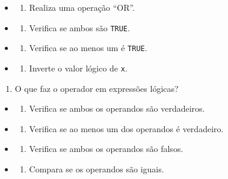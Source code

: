 \documentclass[
]{book}
\providecommand{\tightlist}{%
  \setlength{\itemsep}{0pt}\setlength{\parskip}{0pt}}
\begin{document}
\begin{itemize}
\tightlist
\item
  \begin{enumerate}
  \def\labelenumi{\alph{enumi})}
  \tightlist
  \item
    Realiza uma operação ``OR''.
  \end{enumerate}
\item
  \begin{enumerate}
  \def\labelenumi{\alph{enumi})}
  \setcounter{enumi}{1}
  \tightlist
  \item
    Verifica se ambos são \texttt{TRUE}.
  \end{enumerate}
\item
  \begin{enumerate}
  \def\labelenumi{\alph{enumi})}
  \setcounter{enumi}{2}
  \tightlist
  \item
    Verifica se ao menos um é \texttt{TRUE}.
  \end{enumerate}
\item
  \begin{enumerate}
  \def\labelenumi{\alph{enumi})}
  \setcounter{enumi}{3}
  \tightlist
  \item
    Inverte o valor lógico de \texttt{x}.
  \end{enumerate}
\end{itemize}

\begin{enumerate}
\def\labelenumi{\arabic{enumi}.}
\setcounter{enumi}{4}
\tightlist
\item
  O que faz o operador \texttt{\textbar{}} em expressões lógicas?
\end{enumerate}

\begin{itemize}
\tightlist
\item
  \begin{enumerate}
  \def\labelenumi{\alph{enumi})}
  \tightlist
  \item
    Verifica se ambos os operandos são verdadeiros.
  \end{enumerate}
\item
  \begin{enumerate}
  \def\labelenumi{\alph{enumi})}
  \setcounter{enumi}{1}
  \tightlist
  \item
    Verifica se ao menos um dos operandos é verdadeiro.
  \end{enumerate}
\item
  \begin{enumerate}
  \def\labelenumi{\alph{enumi})}
  \setcounter{enumi}{2}
  \tightlist
  \item
    Verifica se ambos os operandos são falsos.
  \end{enumerate}
\item
  \begin{enumerate}
  \def\labelenumi{\alph{enumi})}
  \setcounter{enumi}{3}
  \tightlist
  \item
    Compara se os operandos são iguais.
  \end{enumerate}
\end{itemize}
\end{document}
